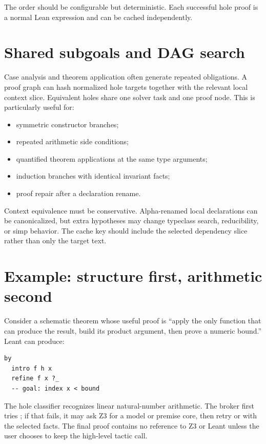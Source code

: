 \documentclass[11pt,letterpaper,openany]{report}
\newcommand{\code}[1]{\texttt{\detokenize{#1}}}
\begin{document}
The order should be configurable but deterministic. Each successful hole proof is a
normal Lean expression and can be cached independently.

\section{Shared subgoals and DAG search}

Case analysis and theorem application often generate repeated obligations. A proof
graph can hash normalized hole targets together with the relevant local context slice.
Equivalent holes share one solver task and one proof node. This is particularly useful
for:

\begin{itemize}
  \item symmetric constructor branches;
  \item repeated arithmetic side conditions;
  \item quantified theorem applications at the same type arguments;
  \item induction branches with identical invariant facts;
  \item proof repair after a declaration rename.
\end{itemize}

Context equivalence must be conservative. Alpha-renamed local declarations can be
canonicalized, but extra hypotheses may change typeclass search, reducibility, or
simp behavior. The cache key should include the selected dependency slice rather than
only the target text.

\section{Example: structure first, arithmetic second}

Consider a schematic theorem whose useful proof is ``apply the only function that can
produce the result, build its product argument, then prove a numeric bound.'' Leant can
produce:

\begin{lstlisting}[language=LeanFour,caption={Illustrative reconstructed skeleton}]
by
  intro f h x
  refine f x ?_
  -- goal: index x < bound
\end{lstlisting}

The hole classifier recognizes linear natural-number arithmetic. The broker first
tries \code{omega}; if that fails, it may ask Z3 for a model or premise core, then retry
\code{omega} or \code{grind} with the selected facts. The final proof contains no
reference to Z3 or Leant unless the user chooses to keep the high-level tactic call.
\end{document}
